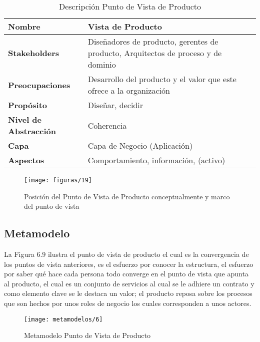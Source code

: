   \begin{table}[H]
  	\centering
  	\begin{tabular}{p{3.7cm}p{8cm}}
  		\hline
  		\rowcolor[HTML]{0073a1}
  		{\color[HTML]{FFFFFF} \textbf{Nombre}} & {\color[HTML]{FFFFFF} \textbf{Vista de Producto}} \\
  		\hline
  		\textbf{Stakeholders} & Diseñadores de producto, gerentes de producto, Arquitectos de proceso y de dominio \\
  		\textbf{Preocupaciones} & Desarrollo del producto y el valor que este ofrece a la organización \\
  		\textbf{Propósito} & Diseñar, decidir \\
  		\textbf{Nivel de Abstracción} & Coherencia \\
  		\textbf{Capa} & Capa de Negocio (Aplicación) \\
  		\textbf{Aspectos} & Comportamiento, información, (activo) \\
  		\bottomrule
  	\end{tabular}
	\captionsetup{width=.95\textwidth}
	\caption{Descripción Punto de Vista de Producto}
	\label{tabla9}
  \end{table}

  \begin{figure}[H]
	\centering
	\texttt{[image: figuras/19]}
	\captionsetup{width=.95\textwidth}
	\caption{Posición del Punto de Vista de Producto conceptualmente y marco del punto de vista}
	\label{figura19}
  \end{figure}
  
  \subsection{Metamodelo}
  La Figura 6.9 ilustra el punto de vista de producto el cual es la convergencia de los puntos de vista anteriores, es el esfuerzo por conocer la estructura, el esfuerzo por saber qué hace cada persona todo converge en el punto de vista que apunta al producto, el cual es un conjunto de servicios al cual se le adhiere un contrato y como elemento clave se le destaca un valor; el producto reposa sobre los procesos que son hechos por unos roles de negocio los cuales corresponden a unos actores.

  \begin{figure}[H]
	\centering
	\texttt{[image: metamodelos/6]}
	\captionsetup{width=.95\textwidth}
	\caption{Metamodelo Punto de Vista de Producto}
	\label{metamodelo6}
  \end{figure}

